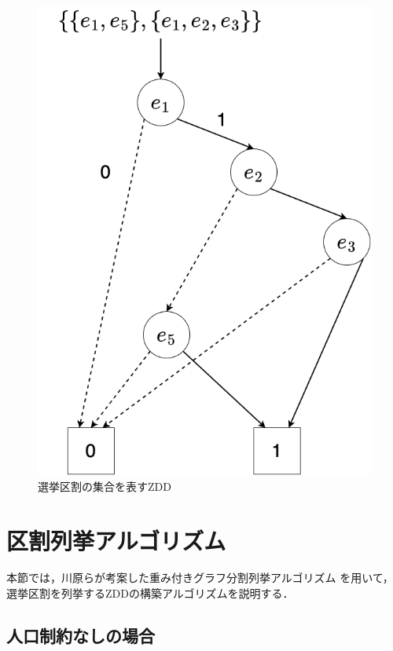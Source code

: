 \begin{figure}[ht]
  \centering
  \includegraphics[scale=0.25]{img/kuwari_zdd.png}
  \caption{選挙区割の集合を表すZDD}
  \label{kuwari_zdd}
\end{figure}


\section{区割列挙アルゴリズム}
本節では，川原らが考案した重み付きグラフ分割列挙アルゴリズム\cite{kawahara}
を用いて，選挙区割を列挙するZDDの構築アルゴリズムを説明する．

\subsection{人口制約なしの場合}



